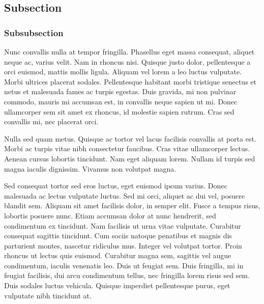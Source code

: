 \documentclass[12,letterpaper]{article}
\begin{document}
\subsection{Subsection}\label{subsection-1}

\subsubsection{Subsubsection}\label{subsubsection-1}

Nunc convallis nulla at tempor fringilla. Phasellus eget massa
consequat, aliquet neque ac, varius velit. Nam in rhoncus nisi. Quisque
justo dolor, pellentesque a orci euismod, mattis mollis ligula. Aliquam
vel lorem a leo luctus vulputate. Morbi ultrices placerat sodales.
Pellentesque habitant morbi tristique senectus et netus et malesuada
fames ac turpis egestas. Duis gravida, mi non pulvinar commodo, mauris
mi accumsan est, in convallis neque sapien ut mi. Donec ullamcorper sem
sit amet ex rhoncus, id molestie sapien rutrum. Cras sed convallis mi,
nec placerat orci.

Nulla sed quam metus. Quisque ac tortor vel lacus facilisis convallis at
porta est. Morbi ac turpis vitae nibh consectetur faucibus. Cras vitae
ullamcorper lectus. Aenean cursus lobortis tincidunt. Nam eget aliquam
lorem. Nullam id turpis sed magna iaculis dignissim. Vivamus non
volutpat magna.

Sed consequat tortor sed eros luctus, eget euismod ipsum varius. Donec
malesuada ac lectus vulputate luctus. Sed mi orci, aliquet ac dui vel,
posuere blandit sem. Aliquam sit amet facilisis dolor, in semper elit.
Fusce a tempus risus, lobortis posuere nunc. Etiam accumsan dolor at
nunc hendrerit, sed condimentum ex tincidunt. Nam facilisis ut urna
vitae vulputate. Curabitur consequat sagittis tincidunt. Cum sociis
natoque penatibus et magnis dis parturient montes, nascetur ridiculus
mus. Integer vel volutpat tortor. Proin rhoncus ut lectus quis euismod.
Curabitur magna sem, sagittis vel augue condimentum, iaculis venenatis
leo. Duis ut feugiat sem. Duis fringilla, mi in feugiat facilisis, dui
arcu condimentum tellus, nec fringilla lorem risus sed sem. Duis sodales
luctus vehicula. Quisque imperdiet pellentesque purus, eget vulputate
nibh tincidunt at.
\end{document}
